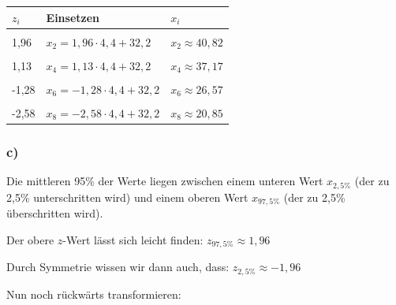 \documentclass[
  11pt,
  ngerman,
  a4paper,
]{report}
\begin{document}
\begin{table}[H]
\centering
\begin{tabular}{l>{\raggedright\arraybackslash}p{8cm}>{\raggedright\arraybackslash}p{8cm}}
\toprule
\textbf{$z_i$} & \textbf{Einsetzen} & \textbf{$x_i$}\\
\midrule
\cellcolor{gray!6}{2,17} & \cellcolor{gray!6}{$x_{1} = 2{,}17 \cdot 4{,}4 + 32{,}2$} & \cellcolor{gray!6}{$x_{1}\approx41{,}75$}\\
1,96 & $x_{2} = 1{,}96 \cdot 4{,}4 + 32{,}2$ & $x_{2}\approx40{,}82$\\
\cellcolor{gray!6}{1,64} & \cellcolor{gray!6}{$x_{3} = 1{,}64 \cdot 4{,}4 + 32{,}2$} & \cellcolor{gray!6}{$x_{3}\approx39{,}42$}\\
1,13 & $x_{4} = 1{,}13 \cdot 4{,}4 + 32{,}2$ & $x_{4}\approx37{,}17$\\
\cellcolor{gray!6}{0} & \cellcolor{gray!6}{$x_{5} = 0 \cdot 4{,}4 + 32{,}2$} & \cellcolor{gray!6}{$x_{5}\approx32{,}2$}\\
-1,28 & $x_{6} = -1{,}28 \cdot 4{,}4 + 32{,}2$ & $x_{6}\approx26{,}57$\\
\cellcolor{gray!6}{-2,33} & \cellcolor{gray!6}{$x_{7} = -2{,}33 \cdot 4{,}4 + 32{,}2$} & \cellcolor{gray!6}{$x_{7}\approx21{,}95$}\\
-2,58 & $x_{8} = -2{,}58 \cdot 4{,}4 + 32{,}2$ & $x_{8}\approx20{,}85$\\
\bottomrule
\end{tabular}
\end{table}

\hypertarget{c-7}{%
\subsubsection{c)}\label{c-7}}

Die mittleren 95\% der Werte liegen zwischen einem unteren Wert \(x_{2{,}5\%}\) (der zu 2,5\% unterschritten wird) und einem oberen Wert \(x_{97{,}5\%}\) (der zu 2,5\% überschritten wird).

Der obere \(z\)-Wert lässt sich leicht finden: \(z_{97{,}5\%} \approx 1{,}96\)

Durch Symmetrie wissen wir dann auch, dass: \(z_{2{,}5\%} \approx -1{,}96\)

Nun noch rückwärts transformieren:
\end{document}
